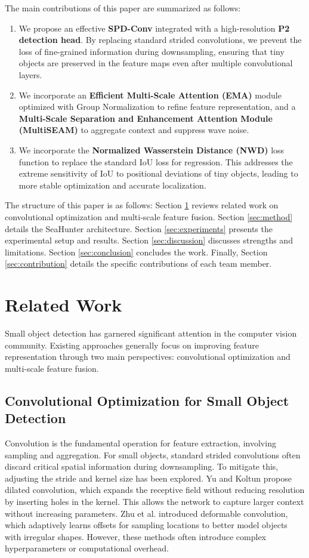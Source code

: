 \documentclass[lettersize,journal]{IEEEtran}
\begin{document}
The main contributions of this paper are summarized as follows:
\begin{enumerate}
    \item We propose an effective \textbf{SPD-Conv} integrated with a high-resolution \textbf{P2 detection head}. By replacing standard strided convolutions, we prevent the loss of fine-grained information during downsampling, ensuring that tiny objects are preserved in the feature maps even after multiple convolutional layers.
    \item We incorporate an \textbf{Efficient Multi-Scale Attention (EMA)} module optimized with Group Normalization to refine feature representation, and a \textbf{Multi-Scale Separation and Enhancement Attention Module (MultiSEAM)} to aggregate context and suppress wave noise.
    \item We incorporate the \textbf{Normalized Wasserstein Distance (NWD)} loss function to replace the standard IoU loss for regression. This addresses the extreme sensitivity of IoU to positional deviations of tiny objects, leading to more stable optimization and accurate localization.
\end{enumerate}

The structure of this paper is as follows: Section \ref{sec:related} reviews related work on convolutional optimization and multi-scale feature fusion. Section \ref{sec:method} details the SeaHunter architecture. Section \ref{sec:experiments} presents the experimental setup and results. Section \ref{sec:discussion} discusses strengths and limitations. Section \ref{sec:conclusion} concludes the work. Finally, Section \ref{sec:contribution} details the specific contributions of each team member.

\section{Related Work}
\label{sec:related}
Small object detection has garnered significant attention in the computer vision community. Existing approaches generally focus on improving feature representation through two main perspectives: convolutional optimization and multi-scale feature fusion.

\subsection{Convolutional Optimization for Small Object Detection}
Convolution is the fundamental operation for feature extraction, involving sampling and aggregation. For small objects, standard strided convolutions often discard critical spatial information during downsampling. To mitigate this, adjusting the stride and kernel size has been explored. Yu and Koltun \cite{ref_dilated} propose dilated convolution, which expands the receptive field without reducing resolution by inserting holes in the kernel. This allows the network to capture larger context without increasing parameters. Zhu et al. \cite{ref17} introduced deformable convolution, which adaptively learns offsets for sampling locations to better model objects with irregular shapes. However, these methods often introduce complex hyperparameters or computational overhead.
\end{document}
